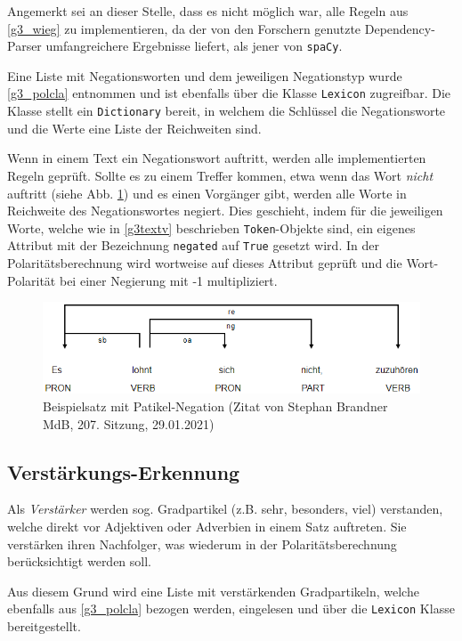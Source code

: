 Angemerkt sei an dieser Stelle, dass es nicht möglich war, alle Regeln aus \ref{g3_wieg} zu implementieren, da der von den Forschern genutzte Dependency-Parser umfangreichere Ergebnisse liefert, als jener von \texttt{spaCy}. 

Eine Liste mit Negationsworten und dem jeweiligen Negationstyp wurde \ref{g3_polcla} entnommen und ist ebenfalls über die Klasse \texttt{Lexicon} zugreifbar. 
Die Klasse stellt ein \texttt{Dictionary} bereit, in welchem die Schlüssel die Negationsworte und die Werte eine Liste der Reichweiten sind. 

Wenn in einem Text ein Negationswort auftritt, werden alle implementierten Regeln geprüft. 
Sollte es zu einem Treffer kommen, etwa wenn das Wort \textit{nicht} auftritt (siehe Abb. \ref{brandner}) und es einen Vorgänger gibt, werden alle Worte in Reichweite des Negationswortes negiert. 
Dies geschieht, indem für die jeweiligen Worte, welche wie in \ref{g3textv} beschrieben \texttt{Token}-Objekte sind, ein eigenes Attribut mit der Bezeichnung \texttt{negated} auf \texttt{True} gesetzt wird. 
In der Polaritätsberechnung wird wortweise auf dieses Attribut geprüft und die Wort-Polarität bei einer Negierung mit -1 multipliziert. 

\begin{figure}[htb]
\centerline{\includegraphics[width=1\textwidth]{brandner.png}}
\caption{Beispielsatz mit Patikel-Negation (Zitat von Stephan Brandner MdB, 207. Sitzung, 29.01.2021)}
\label{brandner}
\end{figure}

\subsection{Verstärkungs-Erkennung}
\label{ver-erkennung}
Als \textit{Verstärker} werden sog. Gradpartikel (z.B. sehr, besonders, viel) verstanden, welche direkt vor Adjektiven oder Adverbien in einem Satz auftreten. 
Sie verstärken ihren Nachfolger, was wiederum in der Polaritätsberechnung berücksichtigt werden soll. 

Aus diesem Grund wird eine Liste mit verstärkenden Gradpartikeln, welche ebenfalls aus \ref{g3_polcla} bezogen werden, eingelesen und über die \texttt{Lexicon} Klasse bereitgestellt. 

